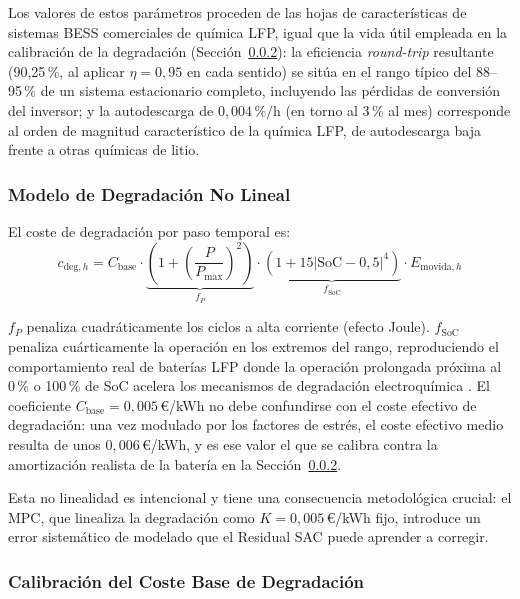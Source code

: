 \documentclass[12pt, a4paper, twoside]{report}
\begin{document}
Los valores de estos parámetros proceden de las hojas de características de
sistemas BESS comerciales de química LFP, igual que la vida útil empleada en
la calibración de la degradación (Sección~\ref{sub:calibracion-degradacion}):
la eficiencia \textit{round-trip} resultante (90,25\,\%, al aplicar
$\eta=0{,}95$ en cada sentido) se sitúa en el rango típico del 88--95\,\% de
un sistema estacionario completo, incluyendo las pérdidas de conversión del
inversor; y la autodescarga de $0{,}004\,\%/\text{h}$ (en torno al 3\,\% al
mes) corresponde al orden de magnitud característico de la química LFP, de
autodescarga baja frente a otras químicas de litio.

\subsubsection{Modelo de Degradación No Lineal}

El coste de degradación por paso temporal es:
\begin{equation}
  c_{\text{deg},h} = C_{\text{base}} \cdot
  \underbrace{\left(1 + \left(\frac{P}{P_{\max}}\right)^2\right)}_{f_P} \cdot
  \underbrace{\left(1 + 15\left|\text{SoC}-0{,}5\right|^4\right)}_{f_{\text{SoC}}} \cdot
  E_{\text{movida},h}
  \label{eq:degradacion}
\end{equation}

$f_P$ penaliza cuadráticamente los ciclos a alta corriente (efecto Joule).
$f_{\text{SoC}}$ penaliza cuárticamente la operación en los extremos del rango,
reproduciendo el comportamiento real de baterías LFP donde la operación
prolongada próxima al 0\,\% o 100\,\% de SoC acelera los mecanismos de
degradación electroquímica \citep{Vetter2005, Xu2016}. El coeficiente
$C_{\text{base}} = 0{,}005$\,€/kWh no debe confundirse con el coste efectivo
de degradación: una vez modulado por los factores de estrés, el coste efectivo
medio resulta de unos $0{,}006$\,€/kWh, y es ese valor el que se calibra
contra la amortización realista de la batería en la
Sección~\ref{sub:calibracion-degradacion}.

Esta no linealidad es intencional y tiene una consecuencia metodológica crucial:
el MPC, que linealiza la degradación como $K = 0{,}005$\,€/kWh fijo, introduce
un error sistemático de modelado que el Residual SAC puede aprender a corregir.

\subsubsection{Calibración del Coste Base de Degradación}
\label{sub:calibracion-degradacion}
\end{document}
